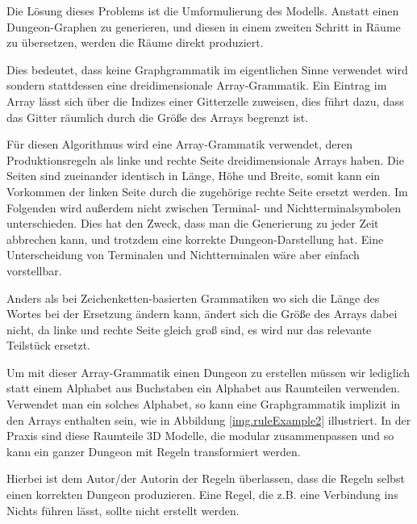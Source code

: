 Die Lösung dieses Problems ist die Umformulierung des Modells. Anstatt einen Dungeon-Graphen zu generieren, und diesen in einem zweiten Schritt in Räume zu übersetzen, werden die Räume direkt produziert. 

Dies bedeutet, dass keine Graphgrammatik im eigentlichen Sinne verwendet wird sondern stattdessen eine dreidimensionale Array-Grammatik. Ein Eintrag im Array lässt sich über die Indizes einer Gitterzelle zuweisen, dies führt dazu, dass das Gitter räumlich durch die Größe des Arrays begrenzt ist.

Für diesen Algorithmus wird eine Array-Grammatik verwendet, deren Produktionsregeln als linke und rechte Seite dreidimensionale Arrays haben. Die Seiten sind zueinander identisch in Länge, Höhe und Breite, somit kann ein Vorkommen der linken Seite durch die zugehörige rechte Seite ersetzt werden. Im Folgenden wird außerdem nicht zwischen Terminal- und Nichtterminalsymbolen unterschieden. Dies hat den Zweck, dass man die Generierung zu jeder Zeit abbrechen kann, und trotzdem eine korrekte Dungeon-Darstellung hat. Eine Unterscheidung von Terminalen und Nichtterminalen wäre aber einfach vorstellbar.



Anders als bei Zeichenketten-basierten Grammatiken wo sich die Länge des Wortes bei der Ersetzung ändern kann, ändert sich die Größe des Arrays dabei nicht, da linke und rechte Seite gleich groß sind, es wird nur das relevante Teilstück ersetzt.


Um mit dieser Array-Grammatik einen Dungeon zu erstellen müssen wir lediglich statt einem Alphabet aus Buchstaben ein Alphabet aus Raumteilen verwenden. Verwendet man ein solches Alphabet, so kann eine Graphgrammatik implizit in den Arrays enthalten sein, wie in Abbildung \ref{img.ruleExample2} illustriert. In der Praxis sind diese Raumteile 3D Modelle, die modular zusammenpassen und so kann ein ganzer Dungeon mit Regeln transformiert werden.

Hierbei ist dem Autor/der Autorin der Regeln überlassen, dass die Regeln selbst einen korrekten Dungeon produzieren. Eine Regel, die z.B. eine Verbindung ins Nichts führen lässt, sollte nicht erstellt werden. 


